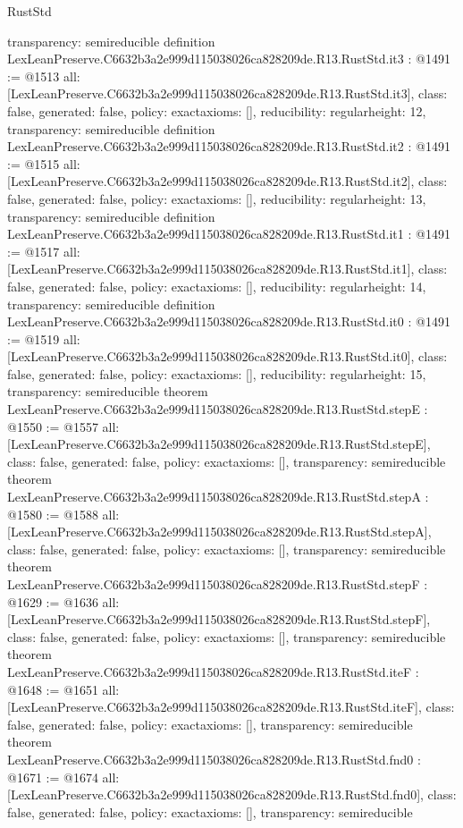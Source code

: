 \begin{lexlean}{RustStd}
\begin{coremodule}
{  transparency: semireducible
}
definition LexLeanPreserve.C6632b3a2e999d115038026ca828209de.R13.RustStd.it3 : @1491 := @1513 {
  all: [LexLeanPreserve.C6632b3a2e999d115038026ca828209de.R13.RustStd.it3],
  class: false,
  generated: false,
  policy: exact{axioms: []},
  reducibility: regular{height: 12},
  transparency: semireducible
}
definition LexLeanPreserve.C6632b3a2e999d115038026ca828209de.R13.RustStd.it2 : @1491 := @1515 {
  all: [LexLeanPreserve.C6632b3a2e999d115038026ca828209de.R13.RustStd.it2],
  class: false,
  generated: false,
  policy: exact{axioms: []},
  reducibility: regular{height: 13},
  transparency: semireducible
}
definition LexLeanPreserve.C6632b3a2e999d115038026ca828209de.R13.RustStd.it1 : @1491 := @1517 {
  all: [LexLeanPreserve.C6632b3a2e999d115038026ca828209de.R13.RustStd.it1],
  class: false,
  generated: false,
  policy: exact{axioms: []},
  reducibility: regular{height: 14},
  transparency: semireducible
}
definition LexLeanPreserve.C6632b3a2e999d115038026ca828209de.R13.RustStd.it0 : @1491 := @1519 {
  all: [LexLeanPreserve.C6632b3a2e999d115038026ca828209de.R13.RustStd.it0],
  class: false,
  generated: false,
  policy: exact{axioms: []},
  reducibility: regular{height: 15},
  transparency: semireducible
}
theorem LexLeanPreserve.C6632b3a2e999d115038026ca828209de.R13.RustStd.stepE : @1550 := @1557 {
  all: [LexLeanPreserve.C6632b3a2e999d115038026ca828209de.R13.RustStd.stepE],
  class: false,
  generated: false,
  policy: exact{axioms: []},
  transparency: semireducible
}
theorem LexLeanPreserve.C6632b3a2e999d115038026ca828209de.R13.RustStd.stepA : @1580 := @1588 {
  all: [LexLeanPreserve.C6632b3a2e999d115038026ca828209de.R13.RustStd.stepA],
  class: false,
  generated: false,
  policy: exact{axioms: []},
  transparency: semireducible
}
theorem LexLeanPreserve.C6632b3a2e999d115038026ca828209de.R13.RustStd.stepF : @1629 := @1636 {
  all: [LexLeanPreserve.C6632b3a2e999d115038026ca828209de.R13.RustStd.stepF],
  class: false,
  generated: false,
  policy: exact{axioms: []},
  transparency: semireducible
}
theorem LexLeanPreserve.C6632b3a2e999d115038026ca828209de.R13.RustStd.iteF : @1648 := @1651 {
  all: [LexLeanPreserve.C6632b3a2e999d115038026ca828209de.R13.RustStd.iteF],
  class: false,
  generated: false,
  policy: exact{axioms: []},
  transparency: semireducible
}
theorem LexLeanPreserve.C6632b3a2e999d115038026ca828209de.R13.RustStd.fnd0 : @1671 := @1674 {
  all: [LexLeanPreserve.C6632b3a2e999d115038026ca828209de.R13.RustStd.fnd0],
  class: false,
  generated: false,
  policy: exact{axioms: []},
  transparency: semireducible
}
\end{coremodule}
\end{lexlean}
